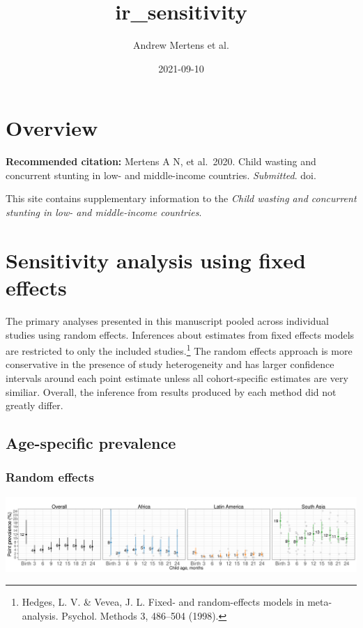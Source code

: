 \documentclass[
  9pt,
]{book}
\title{ir\_sensitivity}
\author{Andrew Mertens et al.}
\date{2021-09-10}
\begin{document}
\maketitle

{
\setcounter{tocdepth}{1}
\tableofcontents
}
\hypertarget{overview}{%
\chapter{Overview}\label{overview}}

\textbf{Recommended citation:} Mertens A N, et al.~2020. Child wasting and concurrent stunting in low- and middle-income countries. \emph{Submitted}. doi.

This site contains supplementary information to the \emph{Child wasting and concurrent stunting in low- and middle-income countries}.

\hypertarget{fixed-effects}{%
\chapter{Sensitivity analysis using fixed effects}\label{fixed-effects}}

\raggedright

The primary analyses presented in this manuscript pooled across individual studies using random effects. Inferences about estimates from fixed effects models are restricted to only the included studies.\footnote{Hedges, L. V. \& Vevea, J. L. Fixed- and random-effects models in meta-analysis. Psychol. Methods 3, 486--504 (1998).} The random effects approach is more conservative in the presence of study heterogeneity and has larger confidence intervals around each point estimate unless all cohort-specific estimates are very similiar. Overall, the inference from results produced by each method did not greatly differ.

\hypertarget{age-specific-prevalence}{%
\section{Age-specific prevalence}\label{age-specific-prevalence}}

\hypertarget{random-effects}{%
\subsection{Random effects}\label{random-effects}}

\includegraphics[width=58.33in]{figures/wasting/fig-wast-2-prev-overall_region--allage-primary}
\end{document}
